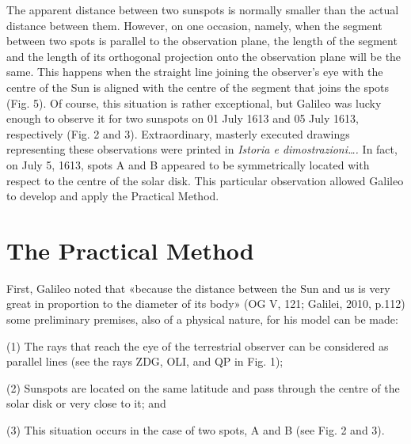 \begin{artengenv}
The apparent distance between two sunspots is normally smaller than the actual distance between them. However, on one
occasion, namely, when the segment between two spots is parallel to the observation plane, the length of the segment
and the length of its orthogonal projection onto the observation plane will be the same. This happens when the straight
line joining the observer’s eye with the centre of the Sun is aligned with the centre of the segment that joins the
spots (Fig. 5). Of course, this situation is rather exceptional, but Galileo was lucky enough to observe it for two
sunspots on 01 July 1613 and 05 July 1613, respectively (Fig. 2 and 3). Extraordinary, masterly executed drawings
representing these observations were printed in \textit{Istoria e dimostrazioni…. }In fact, on July 5, 1613, spots A
and B appeared to be symmetrically located with respect to the centre of the solar disk. This particular observation
allowed Galileo to develop and apply the Practical Method. 

\section{The Practical Method}

First, Galileo noted that «because the distance between the Sun and us is very great in proportion to the diameter of
its body» \label{ref:RNDRTm53mTJKP}(OG V, 121; Galilei, 2010, p.112) some preliminary premises, also of a physical
nature, for his model can be made: 

(1) The rays that reach the eye of the terrestrial observer can be considered as parallel lines (see the rays ZDG, OLI,
and QP in Fig. 1);

(2) Sunspots are located on the same latitude and pass through the centre of the solar disk or very close to it; and

(3) This situation occurs in the case of two spots, A and B (see Fig. 2 and 3).


\end{artengenv}
